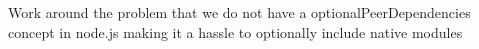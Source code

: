 Work around the problem that we do not have a optional\+Peer\+Dependencies concept in node.\+js making it a hassle to optionally include native modules 